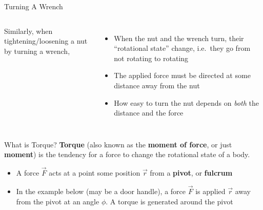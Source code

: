 \documentclass[12pt,compress,aspectratio=169]{beamer}
\begin{document}
\begin{frame}{Turning A Wrench}
  \begin{columns}
    
    Similarly, when tightening/loosening a nut by turning a wrench,
    \begin{itemize}
    \item When the nut and the wrench turn, their ``rotational state'' change,
      i.e.\ they go from not rotating to rotating
    \item The applied force must be directed at some distance away from the
      nut
    \item How easy to turn the nut depends on \emph{both} the distance and the
      force
    \end{itemize}
  \end{columns}
\end{frame}



\begin{frame}{What is Torque?}
  \textbf{Torque} (also known as the \textbf{moment of force}, or just
  \textbf{moment}) is the tendency for a force to change the rotational state
  of a body.
  \begin{itemize}
  \item A force $\vec F$ acts at a point some position $\vec r$ from a
    \textbf{pivot}, or \textbf{fulcrum}
  \item In the example below (may be a door handle), a force $\vec F$ is
    applied $\vec r$ away from the pivot at an angle $\phi$. A torque is
    generated around the pivot
  \end{itemize}
  \begin{center}
  \end{center}
\end{frame}
\end{document}
